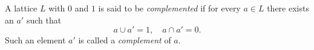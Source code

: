 A lattice $L$ with $0$ and $1$ is said to be \emph{complemented} if for every $a \in L$ there exists an $a'$ such that
$$a \cup a' = 1, \quad a \cap a' = 0.$$
Such an element $a'$ is called a \emph{complement} of $a$.
